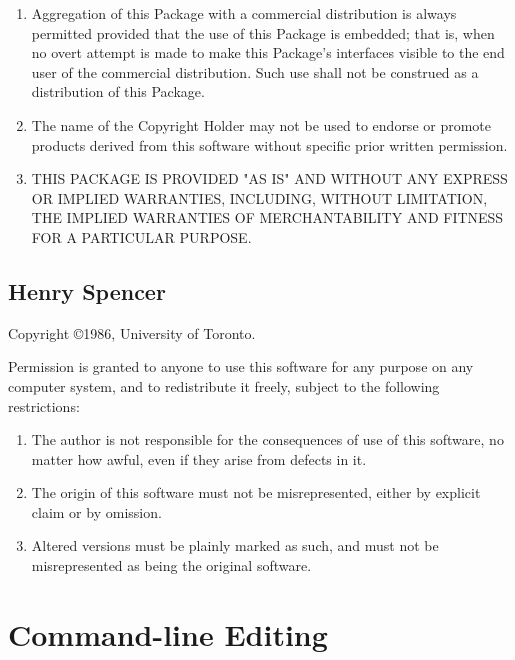 \begin{enumerate}
\item Aggregation of this Package with a commercial distribution is always
permitted provided that the use of this Package is embedded; that is,
when no overt attempt is made to make this Package's interfaces visible
to the end user of the commercial distribution.  Such use shall not be
construed as a distribution of this Package.

\item The name of the Copyright Holder may not be used to endorse or promote
products derived from this software without specific prior written permission.

\item THIS PACKAGE IS PROVIDED "AS IS" AND WITHOUT ANY EXPRESS OR
IMPLIED WARRANTIES, INCLUDING, WITHOUT LIMITATION, THE IMPLIED
WARRANTIES OF MERCHANTABILITY AND FITNESS FOR A PARTICULAR PURPOSE.

\end{enumerate}

\subsection{Henry Spencer}
\begin{center}
Copyright \copyright 1986, University of Toronto.
\end{center}

     Permission is granted to anyone to use this software for any
     purpose on any computer system, and to redistribute it freely,
     subject to the following restrictions:

\begin{enumerate}

     \item The author is not responsible for the consequences of use of
             this software, no matter how awful, even if they arise
             from defects in it.

     \item The origin of this software must not be misrepresented, either
             by explicit claim or by omission.

     \item Altered versions must be plainly marked as such, and must not
             be misrepresented as being the original software.

\end{enumerate}



\section{Command-line Editing}

